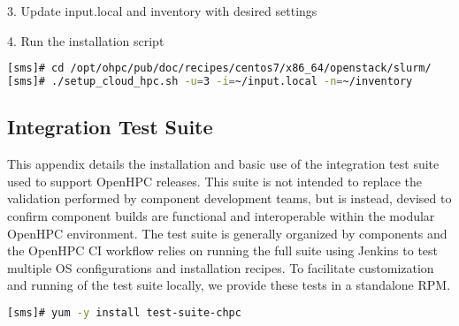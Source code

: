 3. Update input.local and inventory with desired settings

4. Run the installation script

\begin{lstlisting}[language=bash,keywords={},upquote=true]
[sms]# cd /opt/ohpc/pub/doc/recipes/centos7/x86_64/openstack/slurm/
[sms]# ./setup_cloud_hpc.sh -u=3 -i=~/input.local -n=~/inventory
\end{lstlisting}


\newpage
\subsection{Integration Test Suite}
	

This appendix details the installation and basic use of the integration test suite used to support OpenHPC releases. This suite is not intended to replace the validation performed by component development teams, but is instead, devised to confirm component builds are functional and interoperable within the modular OpenHPC environment. The test suite is generally organized by components and the OpenHPC CI workflow relies on running the full suite using Jenkins to test multiple OS configurations and installation recipes. To facilitate customization and running of the test suite locally, we provide these tests in a standalone RPM.
\begin{lstlisting}[language=bash,keywords={},upquote=true]
[sms]# yum -y install test-suite-chpc
\end{lstlisting}

